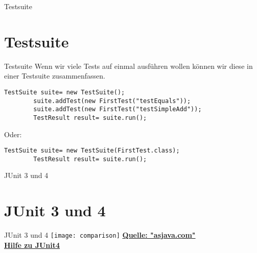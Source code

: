 \documentclass[10pt]{beamer}
\begin{document}
\begin{frame}[fragile]{Testsuite}
    \section{Testsuite}
\end{frame}

\begin{frame}[fragile]{Testsuite}
Wenn wir viele Tests auf einmal ausführen wollen können wir diese in einer Testsuite zusammenfassen.\\
\begin{lstlisting}[basicstyle=\ttfamily\scriptsize,gobble=8]
        TestSuite suite= new TestSuite();
        suite.addTest(new FirstTest("testEquals"));
        suite.addTest(new FirstTest("testSimpleAdd"));
        TestResult result= suite.run();
\end{lstlisting}
Oder:
\begin{lstlisting}[basicstyle=\ttfamily\scriptsize,gobble=8]
        TestSuite suite= new TestSuite(FirstTest.class); 
        TestResult result= suite.run();
\end{lstlisting}
\end{frame}


\begin{frame}[fragile]{JUnit 3 und 4}
    \section{JUnit 3 und 4}
\end{frame}

\begin{frame}[fragile]{JUnit 3 und 4}
    \hfill\texttt{[image: comparison]}
    \textcolor{mymauve}{\textbf{\href{http://asjava.com/junit/junit-3-vs-junit-4-comparisonf}{Quelle: "asjava.com"}}}\\
    \textcolor{mymauve}{\textbf{\href{https://github.com/RatedARRR/TUT-JAVA-2018/blob/master/Slides/Javakurs 11-13.pdf}{Hilfe zu JUnit4}}}
\end{frame}
\end{document}
